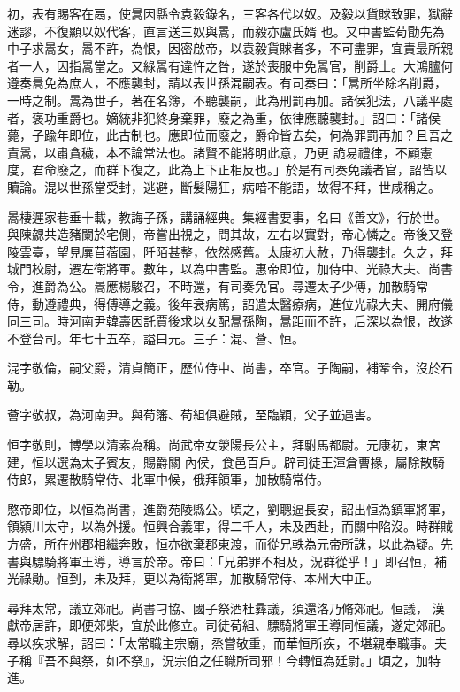 \begin{pinyinscope}
 初，表有賜客在鬲，使暠因縣令袁毅錄名，三客各代以奴。及毅以貨賕致罪，獄辭迷謬，不復顯以奴代客，直言送三奴與暠，而毅亦盧氏婿
 也。又中書監荀勖先為中子求暠女，暠不許，為恨，因密啟帝，以袁毅貨賕者多，不可盡罪，宜責最所親者一人，因指暠當之。又綠暠有違忤之咎，遂於喪服中免暠官，削爵土。大鴻臚何遵奏暠免為庶人，不應襲封，請以表世孫混嗣表。有司奏曰：「暠所坐除名削爵，一時之制。暠為世子，著在名簿，不聽襲嗣，此為刑罰再加。諸侯犯法，八議平處者，褒功重爵也。嫡統非犯終身棄罪，廢之為重，依律應聽襲封。」詔曰：「諸侯薨，子踰年即位，此古制也。應即位而廢之，爵命皆去矣，何為罪罰再加？且吾之責暠，以肅貪穢，本不論常法也。諸賢不能將明此意，乃更
 詭易禮律，不顧憲度，君命廢之，而群下復之，此為上下正相反也。」於是有司奏免議者官，詔皆以贖論。混以世孫當受封，逃避，斷髮陽狂，病喑不能語，故得不拜，世咸稱之。



 暠棲遲家巷垂十載，教誨子孫，講誦經典。集經書要事，名曰《善文》，行於世。與陳勰共造豬闌於宅側，帝嘗出視之，問其故，左右以實對，帝心憐之。帝後又登陵雲臺，望見廙苜蓿園，阡陌甚整，依然感舊。太康初大赦，乃得襲封。久之，拜城門校尉，遷左衛將軍。數年，以為中書監。惠帝即位，加侍中、光祿大夫、尚書令，進爵為公。暠應楊駿召，不時還，有司奏免官。尋遷太子少傅，加散騎常
 侍，動遵禮典，得傅導之義。後年衰病篤，詔遣太醫療病，進位光祿大夫、開府儀同三司。時河南尹韓壽因託賈後求以女配暠孫陶，暠距而不許，后深以為恨，故遂不登台司。年七十五卒，謚曰元。三子：混、薈、恒。



 混字敬倫，嗣父爵，清貞簡正，歷位侍中、尚書，卒官。子陶嗣，補鞏令，沒於石勒。



 薈字敬叔，為河南尹。與荀籓、荀組俱避賊，至臨穎，父子並遇害。



 恒字敬則，博學以清素為稱。尚武帝女滎陽長公主，拜駙馬都尉。元康初，東宮建，恒以選為太子賓友，賜爵關
 內侯，食邑百戶。辟司徒王渾倉曹掾，屬除散騎侍郎，累遷散騎常侍、北軍中候，俄拜領軍，加散騎常侍。



 愍帝即位，以恒為尚書，進爵苑陵縣公。頃之，劉聰逼長安，詔出恒為鎮軍將軍，領潁川太守，以為外援。恒興合義軍，得二千人，未及西赴，而關中陷沒。時群賊方盛，所在州郡相繼奔敗，恒亦欲棄郡東渡，而從兄軼為元帝所誅，以此為疑。先書與驃騎將軍王導，導言於帝。帝曰：「兄弟罪不相及，況群從乎！」即召恒，補光祿勛。恒到，未及拜，更以為衛將軍，加散騎常侍、本州大中正。



 尋拜太常，議立郊祀。尚書刁協、國子祭酒杜彞議，須還洛乃脩郊祀。恒議，
 漢獻帝居許，即便郊柴，宜於此修立。司徒荀組、驃騎將軍王導同恒議，遂定郊祀。尋以疾求解，詔曰：「太常職主宗廟，烝嘗敬重，而華恒所疾，不堪親奉職事。夫子稱『吾不與祭，如不祭』，況宗伯之任職所司邪！今轉恒為廷尉。」頃之，加特進。




\end{pinyinscope}
